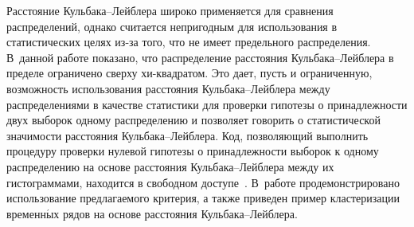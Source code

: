 \begin{multicols}{2}
Расстояние Кульбака--Лейблера широко применяется для сравнения
распределений, однако считается непригодным для использования в статистических
целях из-за того, что не имеет предельного распределения.
В~данной работе показано, что распределение расстояния Кульбака--Лейблера
в пределе ограничено сверху хи-квад\-ра\-том. Это дает, пусть и ограниченную,
возможность использования расстояния Куль\-ба\-ка--Лейб\-ле\-ра между распределениями
в качестве статистики для проверки гипотезы о принадлежности двух выборок
одному распределению и позволяет говорить о статистической значимости
расстояния Куль\-ба\-ка--Лейб\-ле\-ра. Код, позволяющий выполнить процедуру проверки
нулевой гипотезы о принадлежности выборок к одному распределению на основе
расстояния Кульбака--Лейблера между их гистограммами, находится в свободном
доступе~\cite{KLtestCode}. В~работе продемонстрировано использование
предлагаемого критерия, а также приведен пример кластеризации временн$\acute{\mbox{ы}}$х
рядов на основе расстояния Кульбака--Лейблера.


\end{multicols}
